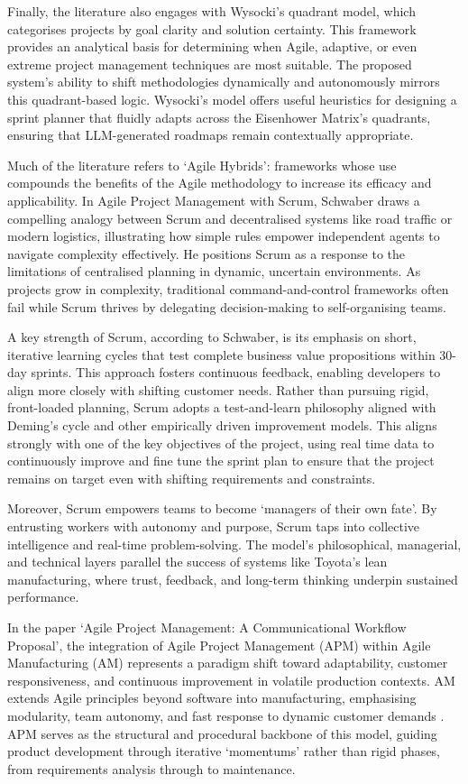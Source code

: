 \documentclass{report}
\begin{document}
Finally, the literature also engages with Wysocki's quadrant model, which categorises projects by goal clarity and solution certainty. 
This framework provides an analytical basis for determining when Agile, adaptive, or even extreme project management techniques are most suitable. 
The proposed system's ability to shift methodologies dynamically and autonomously mirrors this quadrant-based logic. 
Wysocki's model offers useful heuristics for designing a sprint planner that fluidly adapts across the Eisenhower Matrix's quadrants, ensuring that LLM-generated roadmaps remain contextually appropriate.

Much of the literature refers to `Agile Hybrids': frameworks whose use compounds the benefits of the Agile methodology to increase its efficacy and applicability. 
In Agile Project Management with Scrum, Schwaber \parencite{schwaberAgileProjectManagement2004} draws a compelling analogy between Scrum and decentralised systems like road traffic or modern logistics, illustrating how simple rules empower independent agents to navigate complexity effectively.
He positions Scrum as a response to the limitations of centralised planning in dynamic, uncertain environments. 
As projects grow in complexity, traditional command-and-control frameworks often fail while Scrum thrives by delegating decision-making to self-organising teams.

A key strength of Scrum, according to Schwaber, is its emphasis on short, iterative learning cycles that test complete business value propositions within 30-day sprints. 
This approach fosters continuous feedback, enabling developers to align more closely with shifting customer needs. 
Rather than pursuing rigid, front-loaded planning, Scrum adopts a test-and-learn philosophy aligned with Deming's cycle and other empirically driven improvement models. 
This aligns strongly with one of the key objectives of the project, using real time data to continuously improve and fine tune the sprint plan to ensure that the project remains on target even with shifting requirements and constraints.

Moreover, Scrum empowers teams to become `managers of their own fate'. 
By entrusting workers with autonomy and purpose, Scrum taps into collective intelligence and real-time problem-solving. 
The model's philosophical, managerial, and technical layers parallel the success of systems like Toyota's lean manufacturing, where trust, feedback, and long-term thinking underpin sustained performance.

In the paper `Agile Project Management: A Communicational Workflow Proposal', the integration of Agile Project Management (APM) within Agile Manufacturing (AM) represents a paradigm shift toward adaptability, customer responsiveness, and continuous improvement in volatile production contexts. 
AM extends Agile principles beyond software into manufacturing, emphasising modularity, team autonomy, and fast response to dynamic customer demands \parencite{loiroAgileProjectManagement2019}. 
APM serves as the structural and procedural backbone of this model, guiding product development through iterative `momentums' rather than rigid phases, from requirements analysis through to maintenance.
\end{document}
